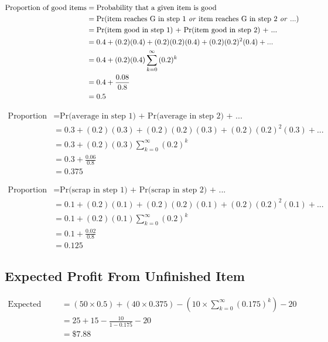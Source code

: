 \documentclass[12pt]{article}
\begin{document}
\begin{align*}
	\text{Proportion of good items} & = \text{Probability that a given item is good} \\
	& = \text{Pr(item reaches G in step 1 \textit{or} item reaches G in step 2 \textit{or} ...)} \\
	& = \text{Pr(item good in step 1) + Pr(item good in step 2) + ...}\\
	& = 0.4 + (0.2)(0.4) + (0.2)(0.2)(0.4) + (0.2)(0.2)^2(0.4) + ... \\
	& = 0.4 + (0.2)(0.4)\sum_{k=0}^{\infty}{(0.2)^k}\\
	& = 0.4 + \frac{0.08}{0.8}\\
	& = 0.5
\end{align*}

\begin{align*}
	\text{Proportion of average items} & = \text{Pr(average in step 1) + Pr(average in step 2) + ...}\\
	& = 0.3 + (0.2)(0.3) + (0.2)(0.2)(0.3) + (0.2)(0.2)^2(0.3) + ... \\
	& = 0.3 + (0.2)(0.3)\sum_{k=0}^{\infty}{(0.2)^k}\\
	& = 0.3 + \frac{0.06}{0.8}\\
	& = 0.375
\end{align*}

\begin{align*}
	\text{Proportion of scrapped items} & = \text{Pr(scrap in step 1) + Pr(scrap in step 2) + ...}\\
	& = 0.1 + (0.2)(0.1) + (0.2)(0.2)(0.1) + (0.2)(0.2)^2(0.1) + ... \\
	& = 0.1 + (0.2)(0.1)\sum_{k=0}^{\infty}{(0.2)^k}\\
	& = 0.1 + \frac{0.02}{0.8}\\
	& = 0.125
\end{align*}

\subsection{Expected Profit From Unfinished Item}

\begin{align*}
\text{Expected profit} & = (50\times0.5) + (40\times0.375) - (10\times\sum_{k=0}^{\infty}{(0.175)^k}) - 20\\
& = 25 + 15 - \frac{10}{1-0.175} - 20\\
& = \$7.88
\end{align*}
\end{document}
